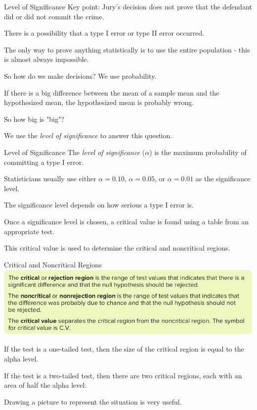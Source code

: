 \documentclass[t, aspectratio=169]{beamer}
\newcommand{\?}{\stackrel{?}{=}}
\begin{document}
	\begin{frame}{Level of Significance}
		Key point: Jury's decision does not prove that the defendant did or did not commit the crime. \pause
		
		There is a possibility that a type I error or type II error occurred. \pause
		
		The only way to prove anything statistically is to use the entire population - this is almost always impossible. \pause
		
		So how do we make decisions? \pause We use probability. \pause
		
		If there is a big difference between the mean of a sample mean and the hypothesized mean, the hypothesized mean is probably wrong. \pause
		
		So how big is "big"? \pause
		
		We use the \textit{level of significance} to answer this question.
	\end{frame}

	\begin{frame}{Level of Significance}
		The \textit{level of significance} ($\alpha$) is the maximum probability of committing a type I error. \pause
		
		Statisticians usually use either $\alpha = 0.10$, $\alpha = 0.05$, or $\alpha = 0.01$ as the significance level. \pause
		
		The significance level depends on how serious a type I error is. \pause
		
		Once a significance level is chosen, a critical value is found using a table from an appropriate test. \pause
		
		This critical value is used to determine the critical and noncritical regions.
	\end{frame}
	
	\begin{frame}{Critical and Noncritical Regions}
		\includegraphics[width=\textwidth]{regions.png} \pause
		
		If the test is a one-tailed test, then the size of the critical region is equal to the alpha level. \pause
		
		If the test is a two-tailed test, then there are two critical regions, each with an area of half the alpha level. \pause
		
		Drawing a picture to represent the situation is very useful.
	\end{frame}
\end{document}

